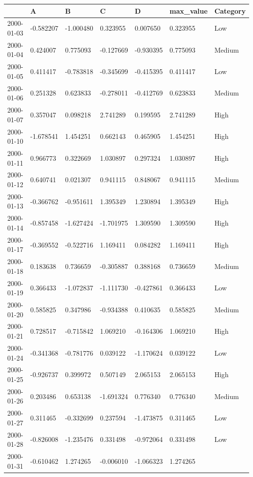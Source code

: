 \documentclass[
  letterpaper,
  DIV=11,
  numbers=noendperiod]{scrartcl}
\begin{document}
\begin{longtable}[]{@{}lllllll@{}}
\toprule()
& A & B & C & D & max\_value & Category \\
\midrule()
\endhead
2000-01-03 & -0.582207 & -1.000480 & 0.323955 & 0.007650 & 0.323955 &
Low \\
2000-01-04 & 0.424007 & 0.775093 & -0.127669 & -0.930395 & 0.775093 &
Medium \\
2000-01-05 & 0.411417 & -0.783818 & -0.345699 & -0.415395 & 0.411417 &
Low \\
2000-01-06 & 0.251328 & 0.623833 & -0.278011 & -0.412769 & 0.623833 &
Medium \\
2000-01-07 & 0.357047 & 0.098218 & 2.741289 & 0.199595 & 2.741289 &
High \\
2000-01-10 & -1.678541 & 1.454251 & 0.662143 & 0.465905 & 1.454251 &
High \\
2000-01-11 & 0.966773 & 0.322669 & 1.030897 & 0.297324 & 1.030897 &
High \\
2000-01-12 & 0.640741 & 0.021307 & 0.941115 & 0.848067 & 0.941115 &
Medium \\
2000-01-13 & -0.366762 & -0.951611 & 1.395349 & 1.230894 & 1.395349 &
High \\
2000-01-14 & -0.857458 & -1.627424 & -1.701975 & 1.309590 & 1.309590 &
High \\
2000-01-17 & -0.369552 & -0.522716 & 1.169411 & 0.084282 & 1.169411 &
High \\
2000-01-18 & 0.183638 & 0.736659 & -0.305887 & 0.388168 & 0.736659 &
Medium \\
2000-01-19 & 0.366433 & -1.072837 & -1.111730 & -0.427861 & 0.366433 &
Low \\
2000-01-20 & 0.585825 & 0.347986 & -0.934388 & 0.410635 & 0.585825 &
Medium \\
2000-01-21 & 0.728517 & -0.715842 & 1.069210 & -0.164306 & 1.069210 &
High \\
2000-01-24 & -0.341368 & -0.781776 & 0.039122 & -1.170624 & 0.039122 &
Low \\
2000-01-25 & -0.926737 & 0.399972 & 0.507149 & 2.065153 & 2.065153 &
High \\
2000-01-26 & 0.203486 & 0.653138 & -1.691324 & 0.776340 & 0.776340 &
Medium \\
2000-01-27 & 0.311465 & -0.332699 & 0.237594 & -1.473875 & 0.311465 &
Low \\
2000-01-28 & -0.826008 & -1.235476 & 0.331498 & -0.972064 & 0.331498 &
Low \\
2000-01-31 & -0.610462 & 1.274265 & -0.006010 & -1.066323 & 1.274265 &

\end{longtable}
\end{document}
